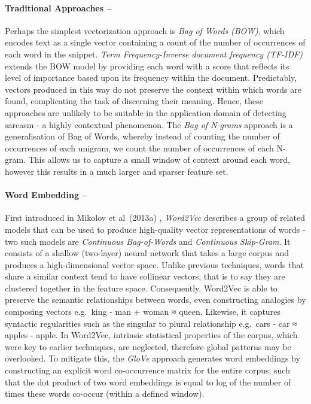 \documentclass[12pt,a4paper]{article}
\begin{document}
\paragraph{Traditional Approaches --}
\noindent Perhaps the simplest vectorization approach is \textit{Bag of Words (BOW)}, which encodes text as a single vector containing a count of the number of occurrences of each word in the snippet. \textit{Term Frequency-Inverse document frequency (TF-IDF)} \cite{robertson1976relevance} extends the BOW model by providing each word with a score that reflects its level of importance based upon its frequency within the document. Predictably, vectors produced in this way do not preserve the context within which words are found, complicating the task of discerning their meaning. Hence, these approaches are unlikely to be suitable in the application domain of detecting sarcasm - a highly contextual phenomenon. The \textit{Bag of N-grams} approach is a generalisation of Bag of Words, whereby instead of counting the number of occurrences of each unigram, we count the number of occurrences of each N-gram. This allows us to capture a small window of context around each word, however this results in a much larger and sparser feature set.
\vfill
\paragraph{Word Embedding --}
\noindent First introduced in Mikolov et al\ (2013a) \cite{mikolov2013efficient}, \textit{Word2Vec} describes a group of related models that can be used to produce high-quality vector representations of words - two such models are \textit{Continuous Bag-of-Words} and \textit{Continuous Skip-Gram}. It consists of a shallow (two-layer) neural network that takes a large corpus and produces a high-dimensional vector space. Unlike previous techniques, words that share a similar context tend to have collinear vectors, that is to say they are clustered together in the feature space. Consequently, Word2Vec is able to preserve the semantic relationships between words, even constructing analogies by composing vectors e.g.\ king - man + woman ≈ queen. Likewise, it captures syntactic regularities such as the singular to plural relationship e.g.\ cars - car ≈ apples - apple. In Word2Vec, intrinsic statistical properties of the corpus, which were key to earlier techniques, are neglected, therefore global patterns may be overlooked. To mitigate this, the \textit{GloVe} \cite{pennington2014glove} approach generates word embeddings by constructing an explicit word co-occurrence matrix for the entire corpus, such that the dot product of two word embeddings is equal to log of the number of times these words co-occur (within a defined window).
\end{document}
